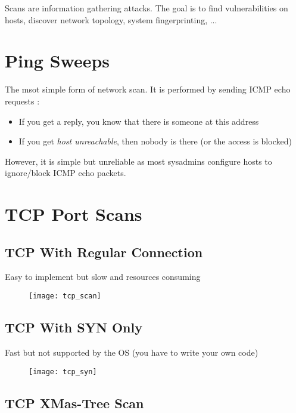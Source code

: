 Scans are information gathering attacks. The goal is to find vulnerabilities on hosts, discover network topology, system fingerprinting, ...

\section{Ping Sweeps}

The msot simple form of network scan. It is performed by sending ICMP echo requests :
\begin{itemize}
    \item If you get a reply, you know that there is someone at this address
    \item If you get \textit{host unreachable}, then nobody is there (or the access is blocked)
\end{itemize}

However, it is simple but unreliable as most sysadmins configure hosts to ignore/block ICMP echo packets.

\section{TCP Port Scans}

\begin{minipage}[t]{0.45\textwidth}
    \subsection{TCP With Regular Connection}
    Easy to implement but slow and resources consuming
	\begin{figure}[H]
		\centering
		\texttt{[image: tcp\_scan]}
	\end{figure}
\end{minipage}
\hfill
\begin{minipage}[t]{0.45\textwidth}
    \subsection{TCP With SYN Only}
    Fast but not supported by the OS (you have to write your own code)
	\begin{figure}[H]
		\centering
		\texttt{[image: tcp\_syn]}
	\end{figure}
\end{minipage}

\subsection{TCP XMas-Tree Scan}


